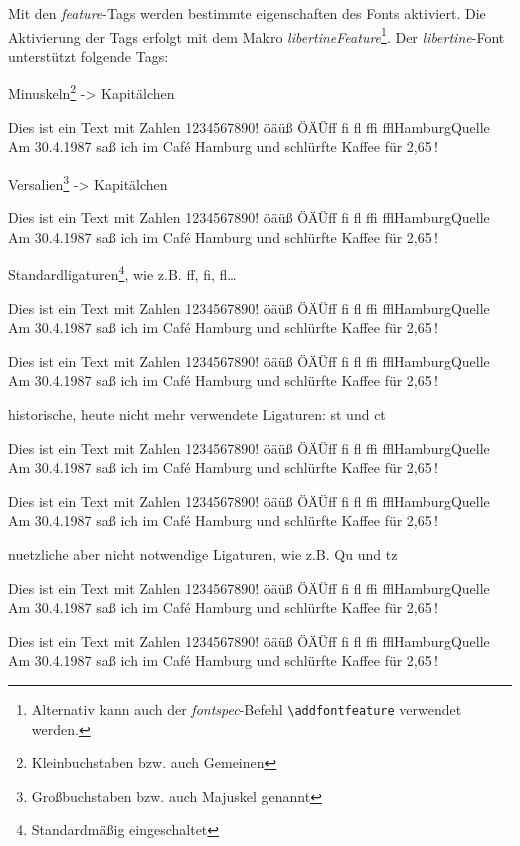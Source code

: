 \documentclass{fontdoku}
\def\TEXT{%
Dies ist ein Text mit Zahlen 1234567890!\newline%
öäüß ÖÄÜ\quad ff fi fl ffi ffl\quad Hamburg\quad Quelle\newline%
Am 30.4.1987 saß ich im \glqq{}Caf\'e Hamburg\grqq{} und schlürfte Kaffee für 2,65\,\libertineEuro!
}
\begin{document}
Mit den \emph{feature}-Tags werden bestimmte eigenschaften des Fonts aktiviert.
Die Aktivierung der Tags erfolgt mit dem Makro \emph{libertineFeature}\footnote{Alternativ kann auch der \emph{fontspec}-Befehl \texttt{\textbackslash addfontfeature} verwendet werden.}.
Der \emph{libertine}-Font unterstützt folgende Tags:%





Minuskeln\footnote{Kleinbuchstaben bzw. auch Gemeinen} -> Kapitälchen

\begin{lstsample}[hpos=l,lstsize=0.4,codesize=0.4,toprule,bottomrule]
\TEXT
\end{lstsample}





Versalien\footnote{Großbuchstaben bzw. auch Majuskel genannt} -> Kapitälchen

\begin{lstsample}[hpos=l,lstsize=0.4,codesize=0.4,toprule,bottomrule]
\TEXT
\end{lstsample}



Standardligaturen\footnote{Standardmäßig eingeschaltet}, wie z.B. ff, fi, fl\dots

\begin{lstsample}[hpos=l,lstsize=0.4,codesize=0.4,toprule,bottomrule]
\TEXT

\TEXT
\end{lstsample}




historische, heute nicht mehr verwendete Ligaturen: st und ct

\begin{lstsample}[hpos=l,lstsize=0.4,codesize=0.4,toprule,bottomrule]
\TEXT

\TEXT
\end{lstsample}





nuetzliche aber nicht notwendige Ligaturen, wie z.B. Qu und tz

\begin{lstsample}[hpos=l,lstsize=0.4,codesize=0.4,toprule,bottomrule]
\TEXT

\TEXT
\end{lstsample}
\end{document}
